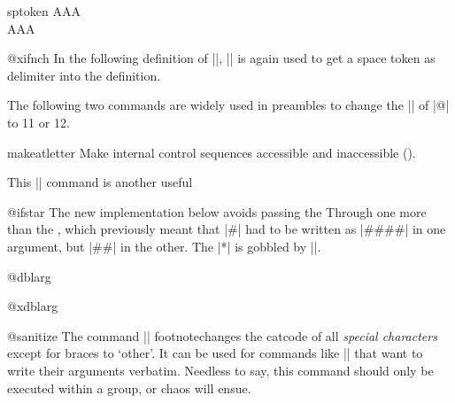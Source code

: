 \begin{texexample}{sptoken}{}
\makeatletter
\noindent
A\:\:A\@sptoken\@sptoken A\\
AAA
\makeatother
\end{texexample}


\begin{docCommand}{@xifnch}{}
    In the following definition of |\@xifnch|, |\:| is again used
    to get a space token as delimiter into the definition.
\begin{teX}
\def\:{\@xifnch} \expandafter\def\: {\futurelet\@let@token\@ifnch}
\end{teX}
\end{docCommand}

The following two commands are widely used in preambles to change the |\catcode| of |@| to 11 or 12.

\begin{docCommand}{makeatletter}{}
Make internal control sequences accessible and inaccessible ().
\begin{teX}
\def\makeatletter{\catcode`\@11\relax}
\def\makeatother{\catcode`\@12\relax}
\end{teX}
\end{docCommand}


This |\@ifstar| command is another useful 
\begin{docCommand}{@ifstar} { }
 The new implementation below avoids passing the 
 Through one more  than the , which previously
 meant that |#| had to be written as |####| in one argument, but |##|
 in the other. The |*| is gobbled by |\@firstoftwo|.
\begin{teX}
\def\@ifstar#1{\@ifnextchar *{\@firstoftwo{#1}}}
\end{teX}
\end{docCommand}

\begin{docCommand}{@dblarg}{}
\begin{docCommand}{@xdblarg}{}

\begin{teX}
\long\def\@dblarg#1{\kernel@ifnextchar[{#1}{\@xdblarg{#1}}}
\long{}
\end{teX}
\end{docCommand}
\end{docCommand}
%

\begin{docCommand}{@sanitize}{}
 The command |\@sanitize| footnotechanges the catcode of all \emph{special characters}
 except for braces to `other'.  It can be used for commands like
 |\index| that want to write their arguments verbatim.  Needless to
 say, this command should only be executed within a group, or chaos
 will ensue.
\end{docCommand}

